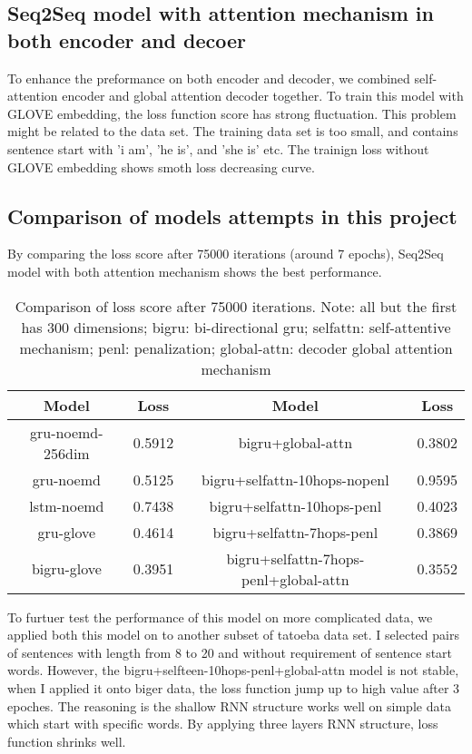 \documentclass{article}
\begin{document}
\subsection{Seq2Seq model with attention mechanism in both encoder and decoer}
To enhance the preformance on both encoder and decoder, we combined self-attention encoder and global attention decoder together. To train this model with GLOVE embedding, the loss function score has strong fluctuation. This problem might be related to the data set. The training data set is too small, and contains sentence start with 'i am', 'he is', and 'she is' etc. The trainign loss without GLOVE embedding shows smoth loss decreasing curve.

\subsection{Comparison of models attempts in this project  }
By comparing the loss score after 75000 iterations (around 7 epochs), Seq2Seq model with both attention mechanism shows the best performance. 

\begin{table}[h]
 \begin{tabular}{||c | c || c | c||} 
 \hline
 Model & Loss & Model & Loss \\ [0.5ex] 
 \hline\hline
 gru-noemd-256dim & 0.5912 & bigru+global-attn & 0.3802 \\ 
 \hline
 gru-noemd & 0.5125 & bigru+selfattn-10hops-nopenl & 0.9595 \\
 \hline
 lstm-noemd & 0.7438 & bigru+selfattn-10hops-penl & 0.4023 \\
 \hline
 gru-glove & 0.4614 & bigru+selfattn-7hops-penl & 0.3869 \\
 \hline
 bigru-glove & 0.3951 & bigru+selfattn-7hops-penl+global-attn & 0.3552 \\ [1ex] 
 \hline
\end{tabular}
\caption{Comparison of loss score after 75000 iterations. Note: all but the first has 300 dimensions; bigru: bi-directional gru; selfattn: self-attentive mechanism; penl: penalization; global-attn: decoder global attention mechanism}
\label{table:1}
\end{table}

To furtuer test the performance of this model on more complicated data, we applied both this model on to another subset of tatoeba data set. I selected pairs of sentences with length from 8 to 20 and without requirement of sentence start words. However, the bigru+selfteen-10hops-penl+global-attn model is not stable, when I applied it onto biger data, the loss function jump up to high value after 3 epoches. The reasoning is the shallow RNN structure works well on simple data which start with specific words. By applying three layers RNN structure, loss function shrinks well. 
\end{document}
